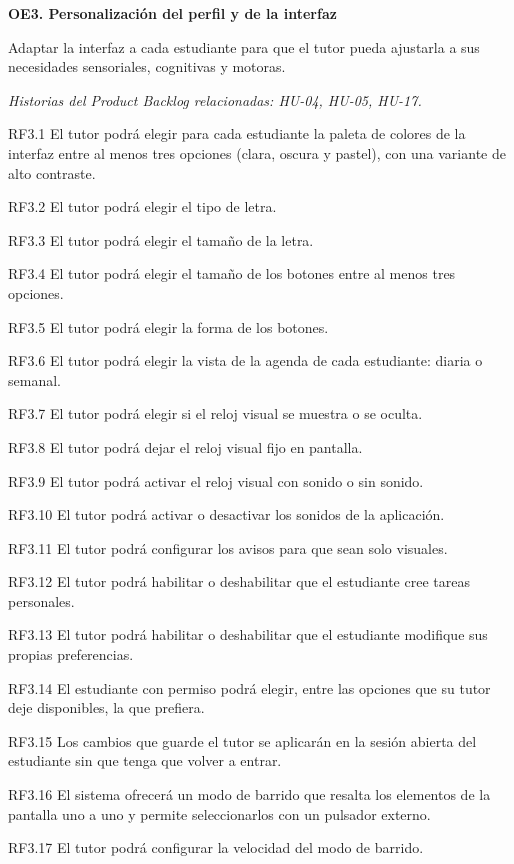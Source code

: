 \documentclass[11pt,a4paper]{article}
\newcommand{\hl}[1]{\textcolor{gblue}{\textbf{#1}}}
\newcommand{\objetivo}[4]{%
  \needspace{11\baselineskip}\par\medskip
  \noindent\colorbox{glight}{\parbox{\dimexpr\linewidth-2\fboxsep\relax}{\raggedright\hl{#1. #2}}}\par\nopagebreak
  #3\par\nopagebreak
  {\small\color{ggray}\textit{Historias del Product Backlog relacionadas: #4.}}\par\nopagebreak}
\newcommand{\grupo}[1]{\needspace{3\baselineskip}\par\smallskip\noindent{\small\bfseries\color{ggreen}#1}\par\nopagebreak}
\begin{document}
\objetivo{OE3}{Personalización del perfil y de la interfaz}{Adaptar la interfaz a cada estudiante para que el tutor pueda ajustarla a sus necesidades sensoriales, cognitivas y motoras.}{HU-04, HU-05, HU-17}
\grupo{Requisitos funcionales (RF)}
\begin{reqs}
\item[RF3.1] El tutor podrá elegir para cada estudiante la paleta de colores de la interfaz entre al menos tres opciones (clara, oscura y pastel), con una variante de alto contraste.
\item[RF3.2] El tutor podrá elegir el tipo de letra.
\item[RF3.3] El tutor podrá elegir el tamaño de la letra.
\item[RF3.4] El tutor podrá elegir el tamaño de los botones entre al menos tres opciones.
\item[RF3.5] El tutor podrá elegir la forma de los botones.
\item[RF3.6] El tutor podrá elegir la vista de la agenda de cada estudiante: diaria o semanal.
\item[RF3.7] El tutor podrá elegir si el reloj visual se muestra o se oculta.
\item[RF3.8] El tutor podrá dejar el reloj visual fijo en pantalla.
\item[RF3.9] El tutor podrá activar el reloj visual con sonido o sin sonido.
\item[RF3.10] El tutor podrá activar o desactivar los sonidos de la aplicación.
\item[RF3.11] El tutor podrá configurar los avisos para que sean solo visuales.
\item[RF3.12] El tutor podrá habilitar o deshabilitar que el estudiante cree tareas personales.
\item[RF3.13] El tutor podrá habilitar o deshabilitar que el estudiante modifique sus propias preferencias.
\item[RF3.14] El estudiante con permiso podrá elegir, entre las opciones que su tutor deje disponibles, la que prefiera.
\item[RF3.15] Los cambios que guarde el tutor se aplicarán en la sesión abierta del estudiante sin que tenga que volver a entrar.
\item[RF3.16] El sistema ofrecerá un modo de barrido que resalta los elementos de la pantalla uno a uno y permite seleccionarlos con un pulsador externo.
\item[RF3.17] El tutor podrá configurar la velocidad del modo de barrido.
\end{reqs}
\end{document}

